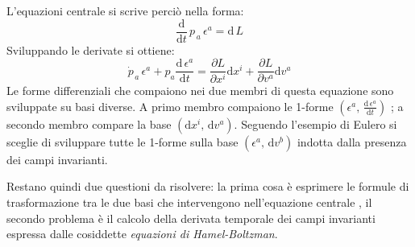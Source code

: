 \documentclass[11pt]{report}
\theoremstyle{plain}
\theoremstyle{definition}
\theoremstyle{remark}
\begin{document}
L'equazioni centrale si scrive perciò nella forma:
\begin{displaymath}
\frac{\textrm{d}}{\textrm{d}t} \, p_{\,a}\, \epsilon^{a} = \textrm{d}\, L
\end{displaymath}
Sviluppando le derivate si ottiene:
\begin{equation}\label{eq:centralebasiincasinate}
\dot{p}_{\,a} \, \epsilon^{a} + p_{a} \dfrac{\textrm{d} \, \epsilon ^{a}}{\textrm{d} t} = \dfrac{\partial L}{\partial x^{i}} \textrm{d}x^{i} + \dfrac{\partial L}{\partial v^{a}} \textrm{d}v^{a}
\end{equation}
Le forme differenziali che compaiono nei due membri di questa equazione sono sviluppate su basi diverse.
A primo membro compaiono le 1-forme $( \epsilon^{a}, \, \frac{\textrm{d} \, \epsilon^{a}}{\textrm{d} t} )$ ; a secondo membro compare la base $( \textrm{d} x^{i}, \, \textrm{d}v^{a} ) $.
Seguendo l'esempio di Eulero si sceglie di sviluppare tutte le 1-forme sulla base $(\epsilon^{a} , \, \textrm{d}v^{b}) $ indotta dalla presenza dei campi invarianti.

Restano quindi due questioni da risolvere: la prima cosa è esprimere le formule di trasformazione tra le due basi che intervengono nell'equazione centrale , il secondo problema è il calcolo della derivata temporale dei campi invarianti espressa dalle cosiddette \emph{equazioni di Hamel-Boltzman}.
\end{document}
